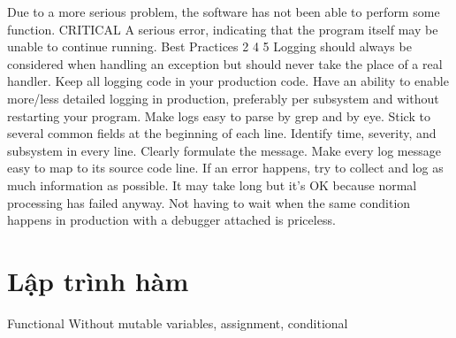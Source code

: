 Due to a more serious problem, the software has not been able to perform some function.
CRITICAL	A serious error, indicating that the program itself may be unable to continue running.
Best Practices 2 4 5
Logging should always be considered when handling an exception but should never take the place of a real handler.
Keep all logging code in your production code. Have an ability to enable more/less detailed logging in production, preferably per subsystem and without restarting your program.
Make logs easy to parse by grep and by eye. Stick to several common fields at the beginning of each line. Identify time, severity, and subsystem in every line. Clearly formulate the message. Make every log message easy to map to its source code line.
If an error happens, try to collect and log as much information as possible. It may take long but it's OK because normal processing has failed anyway. Not having to wait when the same condition happens in production with a debugger attached is priceless.

\section{Lập trình hàm}

Functional
Without mutable variables, assignment, conditional

